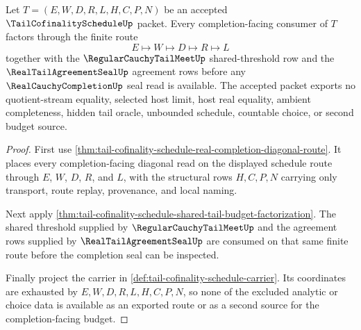 \begin{theorem}
\label{thm:tail-cofinality-schedule-completion-budget-nonescape}
Let $T=(E,W,D,R,L,H,C,P,N)$ be an accepted $\TailCofinalityScheduleUp$ packet. Every completion-facing consumer of $T$ factors through the finite route
$$
E \longmapsto W \longmapsto D \longmapsto R \longmapsto L
$$
together with the $\RegularCauchyTailMeetUp$ shared-threshold row and the $\RealTailAgreementSealUp$ agreement rows before any $\RealCauchyCompletionUp$ seal read is available. The accepted packet exports no quotient-stream equality, selected host limit, host real equality, ambient completeness, hidden tail oracle, unbounded schedule, countable choice, or second budget source.
\end{theorem}
\begin{proof}
First use \autoref{thm:tail-cofinality-schedule-real-completion-diagonal-route}. It places every completion-facing diagonal read on the displayed schedule route through $E$, $W$, $D$, $R$, and $L$, with the structural rows $H,C,P,N$ carrying only transport, route replay, provenance, and local naming.

Next apply \autoref{thm:tail-cofinality-schedule-shared-tail-budget-factorization}. The shared threshold supplied by $\RegularCauchyTailMeetUp$ and the agreement rows supplied by $\RealTailAgreementSealUp$ are consumed on that same finite route before the completion seal can be inspected.

Finally project the carrier in \autoref{def:tail-cofinality-schedule-carrier}. Its coordinates are exhausted by $E,W,D,R,L,H,C,P,N$, so none of the excluded analytic or choice data is available as an exported route or as a second source for the completion-facing budget.
\end{proof}

